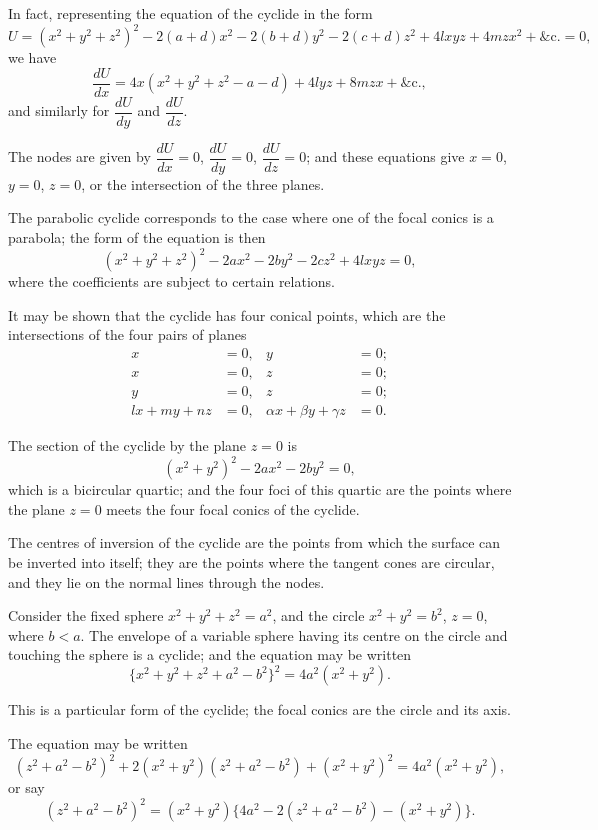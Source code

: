 \documentclass[11pt,a4paper]{book}
\begin{document}
\newpage

In fact, representing the equation of the cyclide in the form
\[
U = (x^2 + y^2 + z^2)^2 - 2(a + d)x^2 - 2(b + d)y^2 - 2(c + d)z^2 + 4lxyz + 4mzx^2 + \&\text{c.} = 0,
\]
we have
\[
\frac{dU}{dx} = 4x(x^2 + y^2 + z^2 - a - d) + 4lyz + 8mzx + \&\text{c.},
\]
and similarly for $\dfrac{dU}{dy}$ and $\dfrac{dU}{dz}$.

The nodes are given by $\dfrac{dU}{dx} = 0$, $\dfrac{dU}{dy} = 0$, $\dfrac{dU}{dz} = 0$; and these equations give $x = 0$, $y = 0$, $z = 0$, or the intersection of the three planes.

The parabolic cyclide corresponds to the case where one of the focal conics is a parabola; the form of the equation is then
\[
(x^2 + y^2 + z^2)^2 - 2ax^2 - 2by^2 - 2cz^2 + 4lxyz = 0,
\]
where the coefficients are subject to certain relations.

\newpage

It may be shown that the cyclide has four conical points, which are the intersections of the four pairs of planes
\begin{align*}
x &= 0, & y &= 0; \\
x &= 0, & z &= 0; \\
y &= 0, & z &= 0; \\
lx + my + nz &= 0, & \alpha x + \beta y + \gamma z &= 0.
\end{align*}

The section of the cyclide by the plane $z = 0$ is
\[
(x^2 + y^2)^2 - 2ax^2 - 2by^2 = 0,
\]
which is a bicircular quartic; and the four foci of this quartic are the points where the plane $z = 0$ meets the four focal conics of the cyclide.

The centres of inversion of the cyclide are the points from which the surface can be inverted into itself; they are the points where the tangent cones are circular, and they lie on the normal lines through the nodes.

\newpage

Consider the fixed sphere $x^2 + y^2 + z^2 = a^2$, and the circle $x^2 + y^2 = b^2$, $z = 0$, where $b < a$. The envelope of a variable sphere having its centre on the circle and touching the sphere is a cyclide; and the equation may be written
\[
\{x^2 + y^2 + z^2 + a^2 - b^2\}^2 = 4a^2(x^2 + y^2).
\]

This is a particular form of the cyclide; the focal conics are the circle and its axis.

The equation may be written
\[
(z^2 + a^2 - b^2)^2 + 2(x^2 + y^2)(z^2 + a^2 - b^2) + (x^2 + y^2)^2 = 4a^2(x^2 + y^2),
\]
or say
\[
(z^2 + a^2 - b^2)^2 = (x^2 + y^2)\{4a^2 - 2(z^2 + a^2 - b^2) - (x^2 + y^2)\}.
\]
\end{document}
